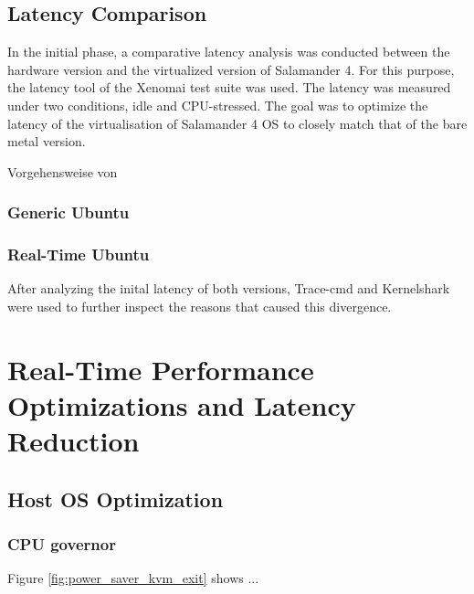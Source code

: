 \documentclass[MMR,Master,english]{twbook}
\begin{document}
\section{Latency Comparison}
In the initial phase, a comparative latency analysis was conducted between the hardware version and the virtualized version of Salamander 4. For this purpose, the latency tool of the Xenomai test suite was used. The latency was measured under two conditions, idle and CPU-stressed. The goal was to optimize the latency of the virtualisation of Salamander 4 OS to closely match that of the bare metal version.

Vorgehensweise von \cite{linPerformanceEvaluationXenomai}


\subsection{Generic Ubuntu}

\subsection{Real-Time Ubuntu}


After analyzing the inital latency of both versions, Trace-cmd and Kernelshark were used to further inspect the reasons that caused this divergence.
\clearpage

\chapter{Real-Time Performance Optimizations and Latency Reduction}\label{cha:latency_reduction}
\section{Host OS Optimization}

\subsection{CPU governor}

Figure \ref{fig:power_saver_kvm_exit} shows ...
\end{document}
